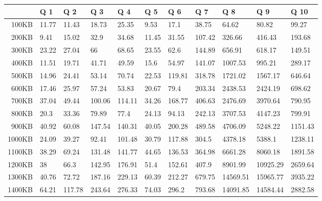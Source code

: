 
\begin {table}[htpb]
\centering
\hspace*{-1.5cm}\begin{tabular}{r|l|l|l|l|l|l|l|l|l|l}
&Q 1&Q 2&Q 3&Q 4&Q 5&Q 6&Q 7&Q 8&Q 9&Q 10\\
\hline
100KB&11.77&11.43&18.73&25.35&9.53&17.1&38.75&64.62&80.82&99.27\\
200KB&9.41&15.02&32.9&34.68&11.45&31.55&107.42&326.66&416.43&193.68\\
300KB&23.22&27.04&66&68.65&23.55&62.6&144.89&656.91&618.17&149.51\\
400KB&11.51&19.71&41.71&49.59&15.6&54.97&141.07&1007.53&995.21&289.17\\
500KB&14.96&24.41&53.14&70.74&22.53&119.81&318.78&1721.02&1567.17&646.64\\
600KB&17.46&25.97&57.24&53.83&20.67&79.4&203.34&2438.53&2424.19&698.62\\
700KB&37.04&49.44&100.06&114.11&34.26&168.77&406.63&2476.69&3970.64&790.95\\
800KB&20.3&33.36&79.89&77.4&24.13&94.13&242.13&3707.53&4147.23&799.91\\
900KB&40.92&60.08&147.54&140.31&40.05&200.28&489.58&4706.09&5248.22&1151.43\\
1000KB&24.09&39.27&92.41&101.48&30.79&117.88&304.5&4378.18&5388.1&1238.11\\
1100KB&38.29&69.24&131.48&141.77&44.65&136.53&364.98&6661.28&8060.18&1891.58\\
1200KB&38&66.3&142.95&176.91&51.4&152.61&407.9&8901.99&10925.29&2659.64\\
1300KB&40.76&72.72&187.16&229.13&60.39&212.27&679.75&14569.51&15965.77&3935.22\\
1400KB&64.21&117.78&243.64&276.33&74.03&296.2&793.68&14091.85&14584.44&2882.58\\


\end{tabular}
\end{table}
